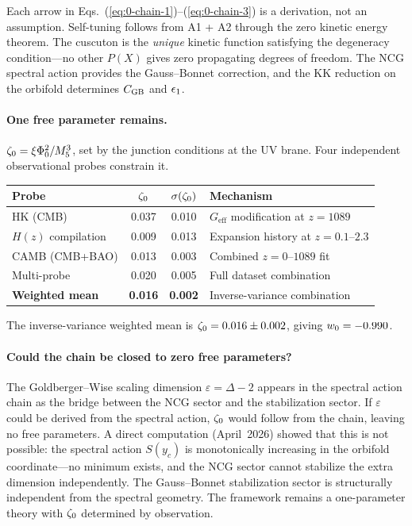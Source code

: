 Each arrow in Eqs.~(\ref{eq:0-chain-1})--(\ref{eq:0-chain-3}) is a
derivation, not an assumption. Self-tuning follows from A1 + A2 through
the zero kinetic energy theorem. The cuscuton is the \emph{unique}
kinetic function satisfying the degeneracy condition---no other $P(X)$
gives zero propagating degrees of freedom. The NCG spectral action
provides the Gauss--Bonnet correction, and the KK reduction on the
orbifold determines $C_{\mathrm{GB}}$ and $\epsilon_1$.

\paragraph{One free parameter remains.}
$\zeta_0 = \xi \Phi_0^2 / M_5^3$, set by the junction conditions at the
UV brane. Four independent observational probes constrain it.

\begin{center}
\small
\begin{tabular}{@{}l c c l@{}}
\toprule
\textbf{Probe} & $\zeta_0$ & $\sigma(\zeta_0)$ & \textbf{Mechanism} \\
\midrule
HK (CMB)          & 0.037 & 0.010 & $G_{\mathrm{eff}}$ modification at $z = 1089$ \\
$H(z)$ compilation& 0.009 & 0.013 & Expansion history at $z = 0.1$--$2.3$ \\
CAMB (CMB+BAO)    & 0.013 & 0.003 & Combined $z = 0$--$1089$ fit \\
Multi-probe       & 0.020 & 0.005 & Full dataset combination \\
\midrule
\textbf{Weighted mean} & \textbf{0.016} & \textbf{0.002} &
Inverse-variance combination \\
\bottomrule
\end{tabular}
\end{center}

\noindent
The inverse-variance weighted mean is $\zeta_0 = 0.016 \pm 0.002$, giving
$w_0 = -0.990$.

\paragraph{Could the chain be closed to zero free parameters?}
The Goldberger--Wise scaling dimension $\varepsilon = \Delta - 2$
appears in the spectral action chain as the bridge between the NCG
sector and the stabilization sector. If $\varepsilon$ could be derived
from the spectral action, $\zeta_0$ would follow from the chain, leaving
no free parameters. A direct computation (April~2026) showed that this
is not possible: the spectral action $S(y_c)$ is monotonically
increasing in the orbifold coordinate---no minimum exists, and the NCG
sector cannot stabilize the extra dimension independently. The
Gauss--Bonnet stabilization sector is structurally independent from
the spectral geometry. The framework remains a one-parameter theory
with $\zeta_0$ determined by observation.

